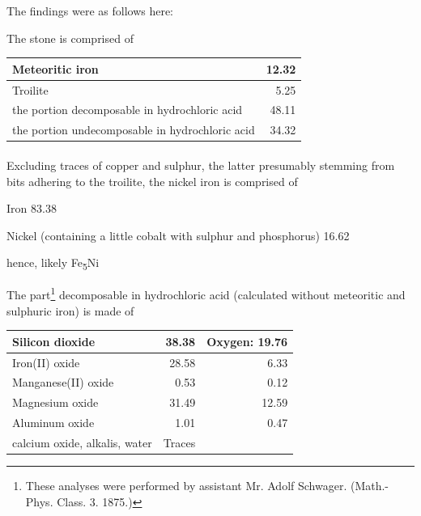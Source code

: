 \documentclass[a4paper, 12pt, oneside]{article}
\begin{document}
The findings were as follows here:

The stone is comprised of
\begin{center}
    \footnotesize
    \begin{tabular}{ |p{3.0cm}|r| } 
    \hline
    Meteoritic iron & 12.32\\\hline
    Troilite & 5.25\\\hline
    the portion decomposable in hydrochloric acid & 48.11\\\hline
    the portion undecomposable in hydrochloric acid & 34.32\\
    \hline
    \end{tabular}
\end{center}
\paragraph*{}
Excluding traces of copper and sulphur, the latter presumably stemming from bits adhering to the troilite, the nickel iron is comprised of

Iron 83.38

Nickel (containing a little cobalt with sulphur and phosphorus) 16.62

hence, likely Fe\textsubscript{5}Ni

The part\footnote{These analyses were performed by assistant Mr. Adolf Schwager. (Math.-Phys. Class. 3. 1875.)} decomposable in hydrochloric acid (calculated without meteoritic and sulphuric iron) is made of
\begin{center}
    \begin{tabular}{ |l|r|r| } 
    \hline
    Silicon dioxide & 38.38 & Oxygen: 19.76\\\hline
    Iron(II) oxide & 28.58 & 6.33\\\hline
    Manganese(II) oxide & 0.53 & 0.12\\\hline
    Magnesium oxide & 31.49 & 12.59\\\hline
    Aluminum oxide & 1.01 & 0.47\\\hline
    calcium oxide, alkalis, water & Traces &\\
    \hline
    \end{tabular}
\end{center}
\end{document}
